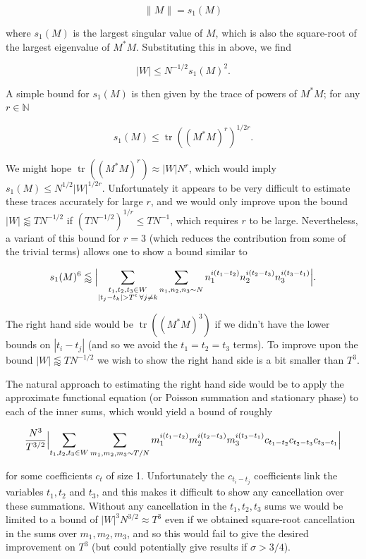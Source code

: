 \documentclass{amsart}
\theoremstyle{plain}
\numberwithin{equation}{section}
\DeclareMathOperator*{\tr}{tr}
\begin{document}
\[
\|M\|= s_1(M)
\]

where $s_1(M)$ is the largest singular value of $M$, which is also the square-root of the largest eigenvalue of $M^*M$. Substituting this in above, we find

\[
|W|\le N^{-1/2}s_1(M)^2.
\]

A simple bound for $s_1(M)$ is then given by the trace of powers of $M^*M$; for any $r\in \mathbb{N}$

\[
s_1(M)\le \tr((M^*M)^r)^{1/2r}.
\]

We might hope $\tr((M^*M)^r)\approx |W|N^{r}$, which would imply $s_1(M)\le N^{1/2}|W|^{1/2r}$. 
Unfortunately it appears to be very difficult to estimate these traces accurately for large $r$, and we would only improve upon the bound $|W|\lessapprox TN^{-1/2}$ if $(TN^{-1/2})^{1/r}\le TN^{-1}$, which requires $r$ to be large. Nevertheless, a variant of this bound for $r=3$ (which reduces the contribution from some of the trivial terms) allows one to show a bound similar to

\[
s_1(M)^6\lessapprox \Bigl|\sum_{\substack{t_1,t_2,t_3\in W\\ |t_j-t_k|>T^\epsilon\,\forall j\ne k}}\sum_{n_1,n_2,n_3\sim N}n_1^{i(t_1-t_2)}n_2^{i(t_2-t_3)}n_3^{i(t_3-t_1)}\Bigr|.
\]

The right hand side would be $\tr((M^*M)^3)$ if we didn't have the lower bounds on $|t_i-t_j|$ (and so we avoid the $t_1=t_2=t_3$ terms). To improve upon the bound $|W|\lessapprox TN^{-1/2}$ we wish to show the right hand side is a bit smaller than $T^3$.

The natural approach to estimating the right hand side would be to apply the approximate functional equation (or Poisson summation and stationary phase) to each of the inner sums, which would yield a bound of roughly

\[
\frac{N^3}{T^{3/2}}\Bigl|\sum_{t_1,t_2,t_3\in W}\sum_{m_1,m_2,m_3\sim T/N}m_1^{i(t_1-t_2)}m_2^{i(t_2-t_3)}m_3^{i(t_3-t_1)}c_{t_1-t_2}c_{t_2-t_3}c_{t_3-t_1}\Bigr|
\]

for some coefficients $c_{t}$ of size 1. Unfortunately the $c_{t_i-t_j}$ coefficients link the variables $t_1,t_2$ and $t_3$, and this makes it difficult to show any cancellation over these summations. Without any cancellation in the $t_1,t_2,t_3$ sums we would be limited to a bound of $|W|^3N^{3/2}\approx T^3$ even if we obtained square-root cancellation in the sums over $m_1,m_2,m_3$, and so this would fail to give the desired improvement on $T^3$ (but could potentially give results if $\sigma>3/4$).
\end{document}
